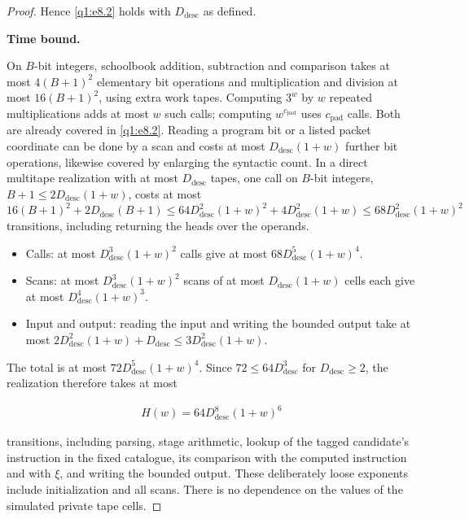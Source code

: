 \begin{proof}
Hence \eqref{q1:e8.2} holds with \(D_{\mathrm{desc}}\) as defined.

\medskip\noindent\textbf{Time bound.}

On \(B\)-bit integers, schoolbook addition, subtraction and comparison takes at most \(4(B+1)^{2}\) elementary bit operations and multiplication and division at most \(16(B+1)^{2}\), using extra work tapes. Computing \(3^{w}\) by \(w\) repeated multiplications adds at most \(w\) such calls; computing \(w^{c_{\mathrm{pad}}}\) uses \(c_{\mathrm{pad}}\) calls. Both are already covered in \eqref{q1:e8.2}. Reading a program bit or a listed packet coordinate can be done by a scan and costs at most \(D_{\mathrm{desc}}(1+w)\) further bit operations, likewise covered by enlarging the syntactic count. In a direct multitape realization with at most \(D_{\mathrm{desc}}\) tapes, one call on \(B\)-bit integers, \(B+1 \le  2D_{\mathrm{desc}}(1+w)\), costs at most \(16(B+1)^{2} + 2D_{\mathrm{desc}}(B+1) \le  64D_{\mathrm{desc}}^{2}(1+w)^{2} + 4D_{\mathrm{desc}}^{2}(1+w) \le  68D_{\mathrm{desc}}^{2}(1+w)^{2}\) transitions, including returning the heads over the operands.
\begin{itemize}
\item Calls: at most \(D_{\mathrm{desc}}^{3}(1+w)^{2}\) calls give at most \(68D_{\mathrm{desc}}^{5}(1+w)^{4}\).
\item Scans: at most \(D_{\mathrm{desc}}^{3}(1+w)^{2}\) scans of at most \(D_{\mathrm{desc}}(1+w)\) cells each give at most \(D_{\mathrm{desc}}^{4}(1+w)^{3}\).
\item Input and output: reading the input and writing the bounded output take at most \(2D_{\mathrm{desc}}^{2}(1+w)+D_{\mathrm{desc}} \le  3D_{\mathrm{desc}}^{2}(1+w)\).
\end{itemize}

The total is at most \(72D_{\mathrm{desc}}^{5}(1+w)^{4}\). Since \(72 \le  64D_{\mathrm{desc}}^{3}\) for \(D_{\mathrm{desc}} \ge  2\), the realization therefore takes at most

\begin{equation}\label{q1:e8.3}
\begin{gathered}
H(w)=64 D_{\mathrm{desc}}^{8}(1+w)^{6}
\end{gathered}
\end{equation}

transitions, including parsing, stage arithmetic, lookup of the tagged candidate's instruction in the fixed catalogue, its comparison with the computed instruction and with \(\xi\), and writing the bounded output. These deliberately loose exponents include initialization and all scans. There is no dependence on the values of the simulated private tape cells.


\end{proof}
